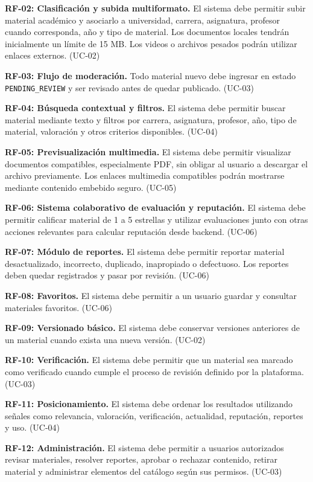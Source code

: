 \documentclass[12pt,a4paper]{article}
\begin{document}
\noindent\textbf{RF-02: Clasificación y subida multiformato.} El sistema debe permitir subir material académico y asociarlo a universidad, carrera, asignatura, profesor cuando corresponda, año y tipo de material. Los documentos locales tendrán inicialmente un límite de 15 MB. Los videos o archivos pesados podrán utilizar enlaces externos. (UC-02)

\noindent\textbf{RF-03: Flujo de moderación.} Todo material nuevo debe ingresar en estado \texttt{PENDING\_REVIEW} y ser revisado antes de quedar publicado. (UC-03)

\noindent\textbf{RF-04: Búsqueda contextual y filtros.} El sistema debe permitir buscar material mediante texto y filtros por carrera, asignatura, profesor, año, tipo de material, valoración y otros criterios disponibles. (UC-04)

\noindent\textbf{RF-05: Previsualización multimedia.} El sistema debe permitir visualizar documentos compatibles, especialmente PDF, sin obligar al usuario a descargar el archivo previamente. Los enlaces multimedia compatibles podrán mostrarse mediante contenido embebido seguro. (UC-05)

\noindent\textbf{RF-06: Sistema colaborativo de evaluación y reputación.} El sistema debe permitir calificar material de 1 a 5 estrellas y utilizar evaluaciones junto con otras acciones relevantes para calcular reputación desde backend. (UC-06)

\noindent\textbf{RF-07: Módulo de reportes.} El sistema debe permitir reportar material desactualizado, incorrecto, duplicado, inapropiado o defectuoso. Los reportes deben quedar registrados y pasar por revisión. (UC-06)

\noindent\textbf{RF-08: Favoritos.} El sistema debe permitir a un usuario guardar y consultar materiales favoritos. (UC-06)

\noindent\textbf{RF-09: Versionado básico.} El sistema debe conservar versiones anteriores de un material cuando exista una nueva versión. (UC-02)

\noindent\textbf{RF-10: Verificación.} El sistema debe permitir que un material sea marcado como verificado cuando cumple el proceso de revisión definido por la plataforma. (UC-03)

\noindent\textbf{RF-11: Posicionamiento.} El sistema debe ordenar los resultados utilizando señales como relevancia, valoración, verificación, actualidad, reputación, reportes y uso. (UC-04)

\noindent\textbf{RF-12: Administración.} El sistema debe permitir a usuarios autorizados revisar materiales, resolver reportes, aprobar o rechazar contenido, retirar material y administrar elementos del catálogo según sus permisos. (UC-03)
\end{document}
